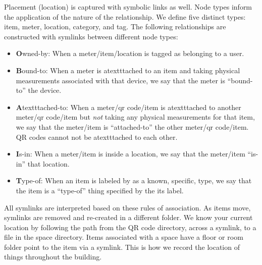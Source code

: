 Placement (location) is captured with symbolic links as well.
Node types inform the application of the nature of the relationship.  We define five distinct types: item, meter, 
location, category, and tag.  The following relationships are constructed with symlinks between different node types:

\begin{itemize}
\item {\textbf Owned-by}: When a meter/item/location is tagged as belonging to a user.
\item {\textbf Bound-to}: When a meter is atextttached to an item and taking physical measurements associated with that 
		device, we say that the meter is ``bound-to'' the device.
\item {\textbf Atextttached-to}: When a meter/qr code/item is atextttached to another meter/qr code/item but \emph{not} taking any 
		physical measurements for that item, we say that the meter/item is ``attached-to'' the other meter/qr 
		code/item.  QR codes cannot not be atextttached to each other.
\item {\textbf Is-in}: When a meter/item is inside a location, we say that the meter/item ``is-in'' that location.
\item {\textbf Type-of}: When an item is labeled by as a known, specific, type, we say that the item is a ``type-of'' thing 
		specified by the its label.
\end{itemize}

All symlinks are interpreted based on these rules of association.  As items move, symlinks are removed and re-created
in a different folder.  We know your current location by following the path from the QR code directory, across a symlink, 
to a file in the space directory.  Items associated with a space have a floor or room folder point to the item
via a symlink.  This is how we record the location of things throughout the building.

